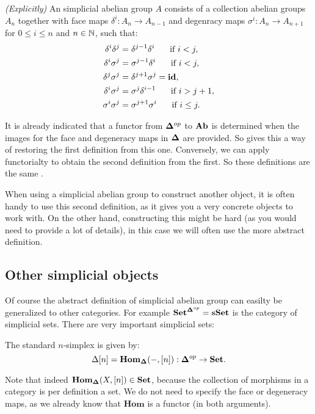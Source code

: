 \begin{definition}
	\emph{(Explicitly)} An simplicial abelian group $A$ consists of a collection abelian groups $A_n$ together with face maps $\delta^i : A_n \to A_{n-1}$ and degenracy maps $\sigma^i : A_n \to A_{n+1}$ for $0 \leq i \leq n$ and $n \in \mathbb{N}$, such that:
	\begin{align}
		\delta^i\delta^j &= \delta^{j-1}\delta^i  \hspace{0.5cm} \text{ if } i < j,\\
		\delta^i\sigma^j &= \sigma^{j-1}\delta^i  \hspace{0.5cm} \text{ if } i < j,\\
		\delta^j\sigma^j &= \delta^{j+1}\sigma^j = \mathbf{id},\\
		\delta^i\sigma^j &= \sigma^j\delta^{i-1}  \hspace{0.5cm} \text{ if } i > j+1,\\
		\sigma^i\sigma^j &= \sigma^{j+1}\sigma^i  \hspace{0.5cm} \text{ if } i \leq j.
	\end{align}
\end{definition}

It is already indicated that a functor from $\mathbf{\Delta}^{op}$ to $\mathbf{Ab}$ is determined when the images for the face and degeneracy maps in $\mathbf{\Delta}$ are provided. So gives this a way of restoring the first definition from this one. Conversely, we can apply functorialty to obtain the second definition from the first. So these definitions are the same .

When using a simplicial abelian group to construct another object, it is often handy to use this second definition, as it gives you a very concrete objects to work with. On the other hand, constructing this might be hard (as you would need to provide a lot of details), in this case we will often use the more abstract definition.


\subsection{Other simplicial objects}
Of course the abstract definition of simplicial abelian group can easilty be generalized to other categories. For example $\mathbf{Set}^{\mathbf{\Delta}^{op}} = \mathbf{sSet}$ is the category of simplicial sets. There are very important simplicial sets:

\begin{definition}
	The standard $n$-simplex is given by:
	$$\Delta[n] = \mathbf{Hom}_{\mathbf{\Delta}}(-, [n]) : \mathbf{\Delta}^{op} \to \mathbf{Set}.$$
\end{definition}

Note that indeed $\mathbf{Hom}_{\mathbf{\Delta}}(X, [n]) \in \mathbf{Set}$, because the collection of morphisms in a category is per definition a set. We do not need to specify the face or degeneracy maps, as we already know that $\mathbf{Hom}$ is a functor (in both arguments).


